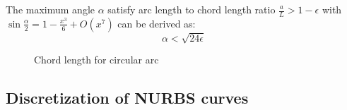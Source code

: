The maximum angle $\alpha$ satisfy arc length to chord length ratio $\frac{a}{L} > 1-\epsilon$ with $
    \sin\frac{\alpha}{2} = 1 - \frac{x^3}{6} + O(x^7)
$ can be derived as:
    \begin{equation}
        \alpha < \sqrt{24 \epsilon}
    \end{equation}

    \begin{figure}[h!]
        \centering
        \caption{Chord length for circular arc}
        \label{qt_fig:iges_chord_ratio}
    \end{figure}

\subsection{Discretization of NURBS curves}
